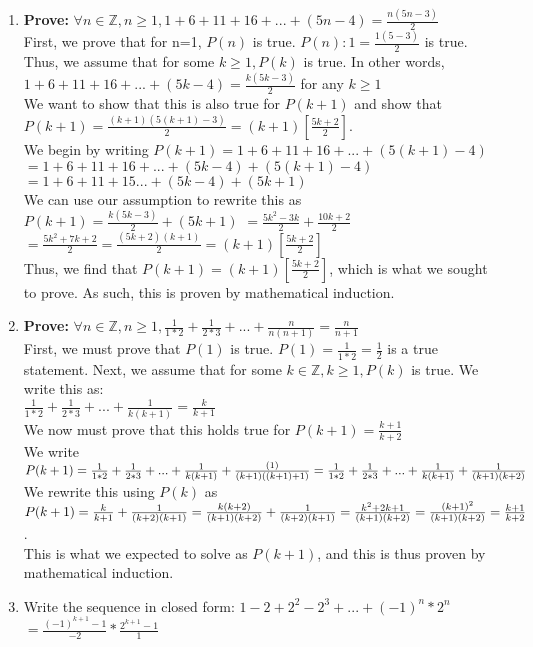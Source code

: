 \documentclass{article}
\makeatletter
\newcommand\setItemnumber[1]{\setcounter{enum\romannumeral\@enumdepth}{\numexpr#1-1\relax}}
\makeatother
\begin{document}
\begin{enumerate}
\begin{enumerate}
    \end{enumerate}
    \setItemnumber{7}
    \item \textbf{Prove: } $\forall n\in\mathbb{Z}, n\geq1, 1+6+11+16+...+(5n-4)=\frac{n(5n-3)}{2}$\\
    First, we prove that for n=1, $P(n)$ is true. $P(n): 1 = \frac{1(5-3)}{2}$ is true.\\
    Thus, we assume that for some $k\geq1, P(k)$ is true. In other words, $1+6+11+16+...+(5k-4) = \frac{k(5k-3)}{2}$ for any $k\geq1$\\
    We want to show that this is also true for $P(k+1)$ and show that $P(k+1) = \frac{(k+1)(5(k+1)-3)}{2} = (k+1)[\frac{5k+2}{2}]$. \\
    We begin by writing $P(k+1) = 1+6+11+16+...+(5(k+1)-4) $\\$= 1+6+11+16+...+(5k-4)+(5(k+1)-4) $\\$= 1+6+11+15...+(5k-4)+(5k+1)$\\
    We can use our assumption to rewrite this as $P(k+1) = \frac{k(5k-3)}{2} + (5k+1)$ $= \frac{5k^2-3k}{2}+\frac{10k+2}{2}$ $=\frac{5k^2+7k+2}{2} = \frac{(5k+2)(k+1)}{2} = (k+1)[\frac{5k+2}{2}]$\\
    Thus, we find that $P(k+1) = (k+1)[\frac{5k+2}{2}]$, which is what we sought to prove. As such, this is proven by mathematical induction.

    \setItemnumber{12}
    \item \textbf{Prove: } $\forall n\in\mathbb{Z}, n\geq1,\frac{1}{1*2}+\frac{1}{2*3}+...+\frac{n}{n(n+1)} = \frac{n}{n+1}$\\
    First, we must prove that $P(1)$ is true. $P(1)=\frac{1}{1*2} = \frac{1}{2}$ is a true statement.
    Next,  we assume that for some $k\in\mathbb{Z}, k\geq1, P(k)$ is true. We write this as:\\$\frac{1}{1*2}+\frac{1}{2*3}+...+\frac{1}{k(k+1)} = \frac{k}{k+1}$\\
    We now must prove that this holds true for $P(k+1) = \frac{k+1}{k+2}$ \\
    We write $P(k+1) =\frac{1}{1*2}+\frac{1}{2*3}+...+\frac{1}{k(k+1)}+\frac{(1)}{(k+1)((k+1)+1)} \\= \frac{1}{1*2}+\frac{1}{2*3}+...+\frac{1}{k(k+1)}+\frac{1}{(k+1)(k+2)} $\\
    We rewrite this using $P(k)$ as $P(k+1)=\frac{k}{k+1}+\frac{1}{(k+2)(k+1)} \\= \frac{k(k+2)}{(k+1)(k+2)}+\frac{1}{(k+2)(k+1)} = \frac{k^2+2k+1}{(k+1)(k+2)}=\frac{(k+1)^2}{(k+1)(k+2)}=\frac{k+1}{k+2}$. \\This is what we expected to solve as $P(k+1)$, and this is thus proven by mathematical induction. 

    \setItemnumber{29}
    \item Write the sequence in closed form: $1-2+2^2-2^3+...+(-1)^n*2^n$\\
    $= \frac{(-1)^{k+1}-1}{-2}*\frac{2^{k+1}-1}{1}$
\end{enumerate}
   
\end{document}
